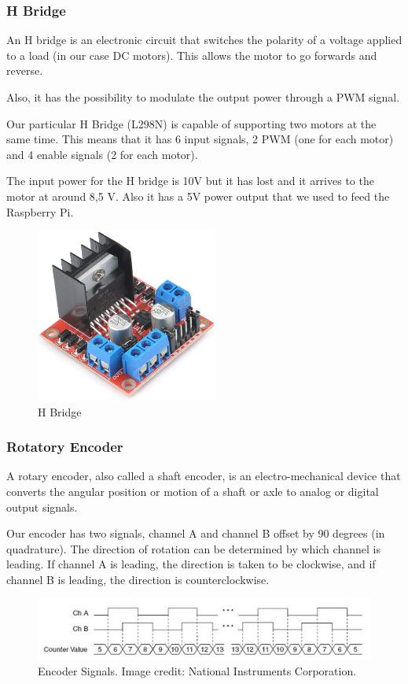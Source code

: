 \subsubsection{H Bridge}
An H bridge is an electronic circuit that switches the polarity of a
voltage applied to a load (in our case DC motors). This allows the motor to
go forwards and reverse.

Also, it has the possibility to modulate the output power through a PWM signal.

Our particular H Bridge (L298N) is capable of supporting two motors at the same time.
This means that it has 6 input signals, 2 PWM (one for each motor) and 4 enable signals
(2 for each motor).

The input power for the H bridge is 10V but it has lost and it arrives to the motor
at around 8,5 V. Also it has a 5V power output that we used to feed the Raspberry
Pi.


\begin{figure}[H]
    \centering
    \includegraphics[width=6cm]{img/components/Hbridge.jpg}
    \caption{H Bridge}
    \label{fig: H Bridge}
\end{figure}


\subsubsection{Rotatory Encoder}
A rotary encoder, also called a shaft encoder, is an electro-mechanical device that converts the
angular position or motion of a shaft or axle to analog or digital output signals.

Our encoder has two signals, channel A and channel B offset by 90
degrees (in quadrature). The direction of rotation can be determined
by which channel is leading. If channel A is leading, the
direction is taken to be clockwise, and if channel B is
leading, the direction is counterclockwise. 

\begin{figure}[H]
    \centering
    \includegraphics[width=14cm]{img/X4-Encoding.jpg}
    \caption{Encoder Signals. Image credit: National Instruments Corporation.}
    \label{fig: Encoder}
\end{figure}


